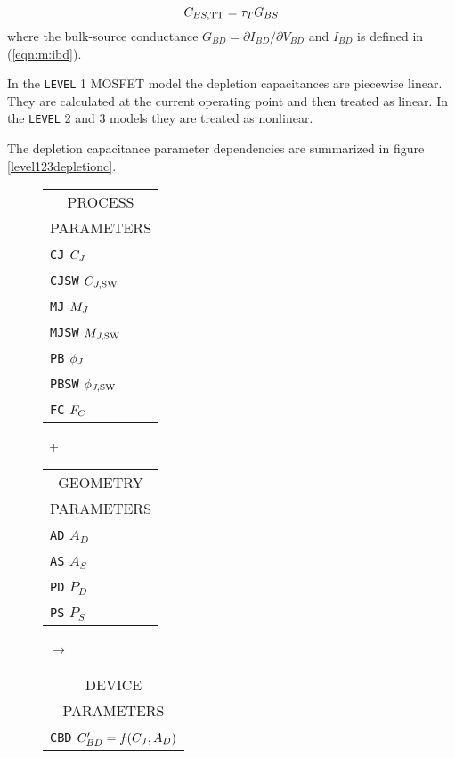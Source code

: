 \begin{equation}
C_{BS,\mbox{\scriptsize TT}} = \tau_T G_{BS}
\end{equation}
where the bulk-source conductance $G_{BD} = \partial I_{BD} / \partial V_{BD}$ and
$I_{BD}$ is defined in (\ref{eqn:m:ibd}).

In the {\tt LEVEL} 1 MOSFET model the depletion capacitances
are piecewise linear.  They are calculated at the current operating point 
and then treated as linear. In the 
{\tt LEVEL} 2 and 3 models they are treated as nonlinear.
{The depletion capacitance parameter dependencies are summarized in
figure \ref{level123depletionc}.\\[0.1in]
\begin{figure}
\parbox[t]{1.3in}{
\begin{tabular}[t]{|p{1in}|}
\hline
\multicolumn{1}{|c|}{PROCESS} \\
\multicolumn{1}{|c|}{PARAMETERS} \\
\hline
\hline
{\tt CJ} \hfill $C_J$\\
{\tt CJSW} \hfill $C_{J,\mbox{\scriptsize SW}}$\\
{\tt MJ} \hfill $M_J$\\
{\tt MJSW} \hfill $M_{J,\mbox{\scriptsize SW}}$\\
{\tt PB} \hfill $\phi_J$\\
{\tt PBSW} \hfill $\phi_{J,{\mbox{\scriptsize SW}}}$\\
{\tt FC} \hfill $F_C$\\
\hline
\end{tabular}
}
\hfill
\parbox{0.1in}{\ \vspace*{0.2in}\newline +}
\hfill
\begin{tabular}[t]{|p{1in}|}
\hline
\multicolumn{1}{|c|}{GEOMETRY} \\
\multicolumn{1}{|c|}{PARAMETERS} \\
\hline
{\tt AD} \hfill $A_D$\\
{\tt AS} \hfill $A_S$\\
{\tt PD} \hfill $P_D$\\
{\tt PS} \hfill $P_S$\\
\hline
\end{tabular}
\hfill
\parbox{0.1in}{\ \vspace*{0.2in}\newline $\rightarrow$}
\hfill
\begin{tabular}[t]{|p{1.8in}|}
\hline
\multicolumn{1}{|c|}{DEVICE} \\
\multicolumn{1}{|c|}{PARAMETERS} \\
\hline
{\tt CBD} \hfill $C'_{BD} = f(C_J, A_D)$\\

\end{tabular}
\end{figure}}
